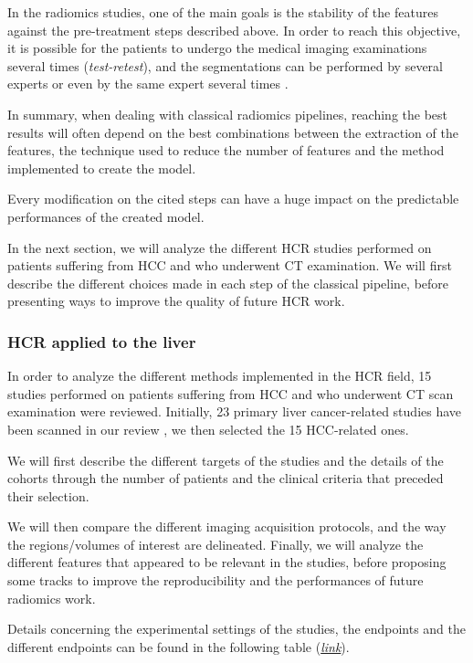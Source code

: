 \documentclass[]{article}
\begin{document}
In the radiomics studies, one of the main goals is the stability of the
features against the pre-treatment steps described above. In order to
reach this objective, it is possible for the patients to undergo the
medical imaging examinations several times (\emph{test-retest}), and the
segmentations can be performed by several experts or even by the same
expert several times \cite{Griethuysen2017}.

In summary, when dealing with classical radiomics pipelines, reaching
the best results will often depend on the best combinations between the
extraction of the features, the technique used to reduce the number of
features and the method implemented to create the model.

Every modification on the cited steps can have a huge impact on the
predictable performances of the created model.

In the next section, we will analyze the different HCR studies
performed on patients suffering from HCC and who underwent CT
examination. We will first describe the different choices made in each
step of the classical pipeline, before presenting ways to improve the
quality of future HCR work.

\subsubsection{HCR applied to the liver}\label{hcr-applied-to-the-liver}

In order to analyze the different methods implemented in the HCR
field, 15 studies performed on patients suffering from HCC and who
underwent CT scan examination were reviewed. Initially, 23 primary liver
cancer-related studies have been scanned in our review \cite{Wakabayashi2019}, we then selected the 15 HCC-related ones.

We will first describe the different targets of the studies and the
details of the cohorts through the number of patients and the clinical
criteria that preceded their selection.

We will then compare the different imaging acquisition protocols, and
the way the regions/volumes of interest are delineated. Finally, we will
analyze the different features that appeared to be relevant in the
studies, before proposing some tracks to improve the reproducibility and
the performances of future radiomics work.

Details concerning the experimental settings of the studies, the
endpoints and the different endpoints can be found in the following
table
(\href{https://docs.google.com/spreadsheets/u/0/d/10EHNALN2_6ZavU7049n6CwTfJO_vd6WBod64u8YNbHg/edit}{\emph{link}}).
\end{document}
